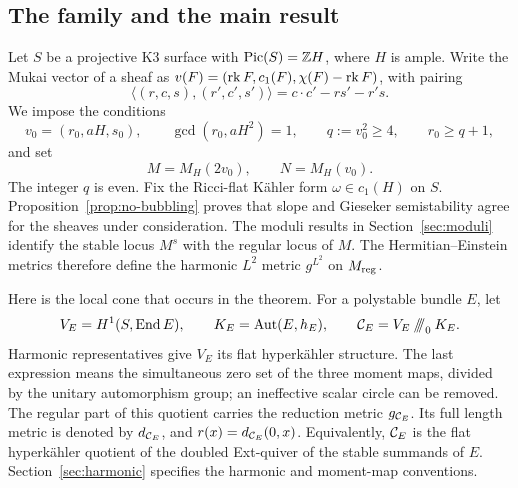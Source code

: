 \subsection{The family and the main result}
Let $S$ be a projective K3 surface with
$\operatorname{Pic}(S)=\mathbb Z H$, where $H$ is ample. Write the Mukai
vector of a sheaf as $v(F)=(\operatorname{rk} F,c_1(F),\chi(F)-\operatorname{rk} F)$, with
pairing
\[
 \langle(r,c,s),(r',c',s')\rangle=c\cdot c'-rs'-r's.
\]
We impose the conditions
\begin{equation}\label{eq:family}
 v_0=(r_0,aH,s_0),\qquad
 \gcd(r_0,aH^2)=1,\qquad q:=v_0^2\ge4,
 \qquad r_0\ge q+1,
\end{equation}
and set
\begin{equation}\label{eq:MN}
 M=M_H(2v_0),\qquad N=M_H(v_0).
\end{equation}
The integer $q$ is even. Fix the Ricci-flat K\"ahler form
$\omega\in c_1(H)$ on $S$.
Proposition~\ref{prop:no-bubbling} proves that slope and Gieseker
semistability agree for the sheaves under consideration.
The moduli results in Section~\ref{sec:moduli} identify
the stable locus $M^s$ with the regular locus of $M$. The
Hermitian--Einstein metrics therefore define the harmonic $L^2$
metric $g^{L^2}$ on $M_{\mathrm{reg}}$.

Here is the local cone that occurs in the theorem. For a polystable
bundle $E$, let
\begin{equation}\label{eq:cone-intro}
 V_E=H^1(S,\operatorname{End} E),\qquad K_E=\operatorname{Aut}(E,h_E),\qquad
 \mathcal C_E=V_E\mathbin{/\!\!/\!\!/}_0K_E.
\end{equation}
Harmonic representatives give $V_E$ its flat hyperk\"ahler
structure. The last expression means the simultaneous zero set of
the three moment maps, divided by the unitary automorphism group;
an ineffective scalar circle can be removed. The regular part of
this quotient carries the reduction metric $g_{\mathcal C_E}$. Its full
length metric is denoted by $d_{\mathcal C_E}$, and
$r(x)=d_{\mathcal C_E}(0,x)$. Equivalently, $\mathcal C_E$ is the flat
hyperk\"ahler quotient of the doubled Ext-quiver of the stable
summands of $E$. Section~\ref{sec:harmonic} specifies the harmonic
and moment-map conventions.

